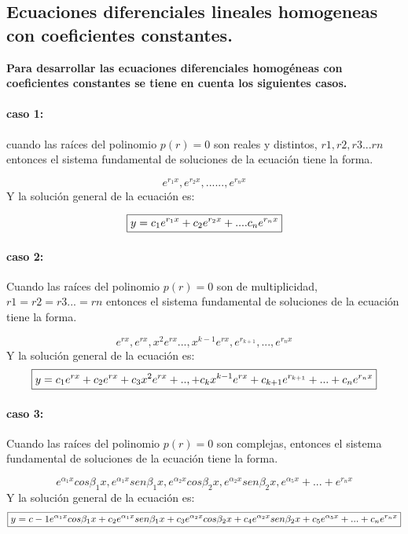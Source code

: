 \documentclass{article}
\begin{document}
\subsection{Ecuaciones diferenciales lineales homogeneas con coeficientes constantes.}

\textbf{Para desarrollar las ecuaciones diferenciales homogéneas con coeficientes constantes se tiene en cuenta los siguientes casos. }
\paragraph{caso 1:}
cuando las raíces del polinomio $p(r)=0$ son reales y distintos, $r1,r2,r3...rn$ entonces el sistema fundamental de soluciones de la ecuación tiene la forma.

\begin{equation}
e^{r_1x},e^{r_2x},......,e^{r_nx}
\end{equation}
Y la solución general de la ecuación es: 
\begin{center}
\begin{equation}
$$ \boxed{y =c_1e^{r_1x}+c_2e^{r_2x}+....c_ne^{r_nx}}$$
\end{equation}
\end{center}


\paragraph{caso 2:}
Cuando las raíces del polinomio $p(r)=0$ son de multiplicidad, $r1=r2=r3...=rn$ entonces el sistema fundamental de soluciones de la ecuación tiene la forma.

\begin{equation}
e^{rx},e^{rx},x^2e^{rx}...,x^{k-1}e^{rx},e^{r_{k+1}},...,e^{r_nx}
\end{equation}
Y la solución general de la ecuación es: \begin{equation}
$$ \boxed{y =c_1e^{rx}+c_2e^{rx}+c_3x^2e^{rx}+..,+c_kx^{k-1}e^{rx}+c_{k+1}e^{r_{k+1}}+...+c_ne^{r_nx}}$$
\end{equation}

\paragraph{caso 3:}
Cuando las raíces del polinomio $p(r)=0$ son complejas, entonces el sistema fundamental de soluciones de la ecuación tiene la forma.

\begin{equation}
e^{\alpha_1x}cos\beta_1x,e^{\alpha_1x}sen\beta_1x,e^{\alpha_2x}cos\beta_2x,e^{\alpha_2x}sen\beta_2x,e^{\alpha_5x}+...+e^{r_nx}
\end{equation}
Y la solución general de la ecuación es: 
\begin{equation}
$$ \boxed{y=c-1e^{\alpha_1x}cos\beta_1x+c_2e^{\alpha_1x}sen\beta_1x+c_3e^{\alpha_2x}cos\beta_2x+c_4e^{\alpha_2x}sen\beta_2x+c_5e^{\alpha_5x}+...+c_ne^{r_nx}}$$
\end{equation}
\cite{edicion2}
\end{document}
